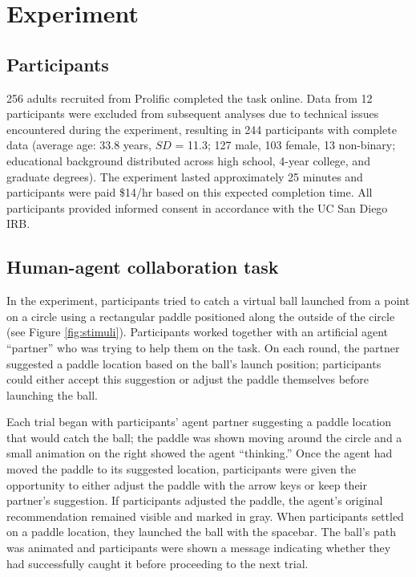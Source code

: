 \documentclass[10pt,letterpaper]{article}
\begin{document}
\section{Experiment}

\subsection{Participants}

256 adults recruited from Prolific completed the task online. Data from 12 participants were excluded from subsequent analyses due to technical issues encountered during the experiment, resulting in 244 participants with complete data (average age: 33.8 years, $SD$ = 11.3; 127 male, 103 female, 13 non-binary; educational background distributed across high school, 4-year college, and graduate degrees). The experiment lasted approximately 25 minutes and participants were paid \$14/hr based on this expected completion time. 
All participants provided informed consent in accordance with the UC San Diego IRB.


\subsection{Human-agent collaboration task}

In the experiment, participants tried to catch a virtual ball launched from a point on a circle using a rectangular paddle positioned along the outside of the circle (see Figure \ref{fig:stimuli}).\footnotemark{} 
Participants worked together with an artificial agent ``partner'' who was trying to help them on the task. On each round, the partner suggested a paddle location based on the ball's launch position; participants could either accept this suggestion or adjust the paddle themselves before launching the ball.


Each trial began with participants' agent partner suggesting a paddle location that would catch the ball; the paddle was shown moving around the circle and a small animation on the right showed the agent ``thinking.'' Once the agent had moved the paddle to its suggested location, participants were given the opportunity to either adjust the paddle with the arrow keys or keep their partner's suggestion. If participants adjusted the paddle, the agent's original recommendation remained visible and marked in gray. When participants settled on a paddle location, they launched the ball with the spacebar. The ball's path was animated and participants were shown a message indicating whether they had successfully caught it before proceeding to the next trial. 
\end{document}
